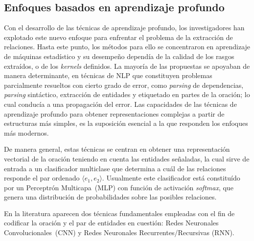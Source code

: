 \subsection{Enfoques basados en aprendizaje profundo}

Con el desarrollo de las técnicas de aprendizaje profundo, los investigadores han explotado este nuevo enfoque para enfrentar el problema de la extracción de relaciones.
Hasta este punto, los métodos para ello se concentraron en aprendizaje de máquinas estadístico y su desempeño dependía de la calidad de los rasgos extraídos, o de los \textit{kernels} definidos.
La mayoría de las propuestas se apoyaban de manera determinante, en técnicas de NLP que constituyen problemas parcialmente resueltos con cierto grado de error, como \textit{parsing} de dependencias, \textit{parsing} sintáctico, extracción de entidades y etiquetado en partes de la oración; lo cual conducía a una propagación del error.
Las capacidades de las técnicas de aprendizaje profundo para obtener representaciones complejas a partir de estructuras más simples, es la suposición esencial a la que responden los enfoques más modernos.

De manera general, estas técnicas se centran en obtener una representación vectorial de la oración teniendo en cuenta las entidades señaladas, la cual sirve de entrada a un clasificador multiclase que determina a cuál de las relaciones responde el par ordenado $\langle e_1,e_2\rangle$.
Usualmente este clasificador está constituído por un Perceptrón Multicapa~(MLP) con función de activación \textit{softmax}, que genera una distribución de probabilidades sobre las posibles relaciones.

En la literatura aparecen dos técnicas fundamentales empleadas con el fin de codificar la oración y el par de entidades en cuestión: Redes Neuronales Convolucionales~(CNN) y Redes Neuronales Recurrentes/Recursivas (RNN).

